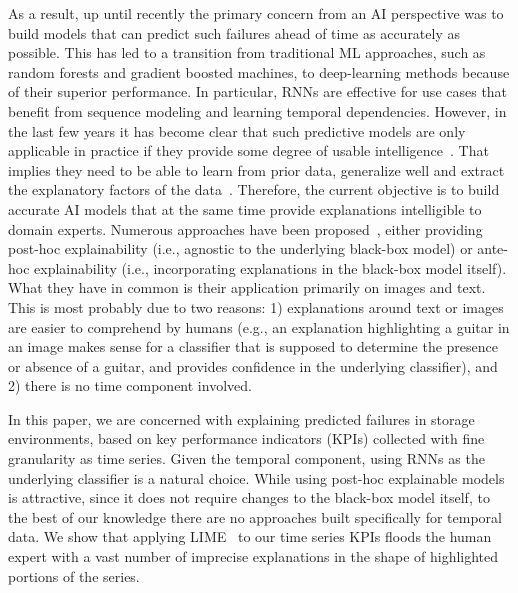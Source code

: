 \documentclass[letterpaper]{article} %
\begin{document}
As a result, up until recently the primary concern from an AI perspective was to build models that can predict such failures ahead of time as accurately as possible. This has led to a transition from traditional ML approaches, such as random forests and gradient boosted machines, to deep-learning methods because of their superior performance. In particular, RNNs are effective for use cases that benefit from  sequence modeling and learning temporal dependencies. However, in the last few years it has become clear that such predictive models are only applicable in practice if they provide some degree of usable intelligence~\cite{crafting,pneumonia}. That implies they need to be able to learn from prior data, generalize well and extract the explanatory factors of the data~\cite{representation}. Therefore, the current objective is to build accurate AI models that at the same time provide explanations intelligible to domain experts. Numerous approaches have been proposed~\cite{lime,layerwise,decisionsets,anchors,pairwise,additive}, either providing post-hoc explainability (i.e., agnostic to the underlying black-box model) or ante-hoc explainability (i.e., incorporating explanations in the black-box model itself). What they have in common is their application primarily on images and text. This is most probably due to two reasons: 1) explanations around text or images are easier to comprehend by humans (e.g., an explanation highlighting a guitar in an image makes sense for a classifier that is supposed to determine the presence or absence of a guitar, and provides confidence in the underlying classifier), and 2) there is no time component involved.

In this paper, we are concerned with explaining predicted failures in storage environments, based on key performance indicators (KPIs) collected with fine granularity as time series. Given the temporal component, using RNNs as the underlying classifier is a natural choice. While using post-hoc explainable models is attractive, since it does not require changes to the black-box model itself, to the best of our knowledge there are no approaches built specifically for temporal data. We show that applying LIME~\cite{lime} to our time series KPIs floods the human expert with a vast number of imprecise explanations in the shape of highlighted portions of the series.
\end{document}
